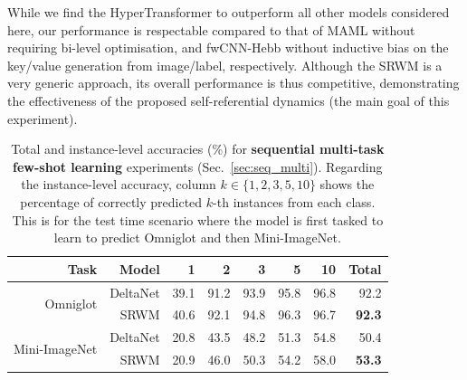 \documentclass[nohyperref]{article}
\theoremstyle{plain}
\theoremstyle{definition}
\theoremstyle{remark}
\begin{document}
While we find the HyperTransformer to outperform all other models considered here,
our performance is respectable compared to that of MAML without requiring bi-level optimisation, and fwCNN-Hebb without inductive bias on the key/value generation from image/label, respectively.
Although the SRWM is a very generic approach, its overall performance is thus competitive,
demonstrating the effectiveness of the proposed self-referential dynamics (the main goal of this experiment).


\begin{table}[h]
\caption{Total and instance-level accuracies (\%) for \textbf{sequential multi-task few-shot learning}
experiments (Sec.~\ref{sec:seq_multi}).
Regarding the instance-level accuracy, column $k \in \{1, 2, 3, 5, 10\}$ shows the percentage of correctly predicted $k$-th instances from each class.
This is for the test time scenario where the model is first tasked to learn to predict Omniglot and then Mini-ImageNet.
}
\label{tab:seq_adapt}
\begin{center}
\begin{tabular}{rr|rrrrr|r}
\toprule
Task & Model & 1 & 2 & 3 & 5 & 10 & Total \\ \midrule
\multirow{2}{*}{Omniglot}  & DeltaNet & 39.1 & 91.2 & 93.9 & 95.8 & 96.8 & 92.2 \\
         & SRWM & 40.6 & 92.1 & 94.8 & 96.3 & 96.7 & \textbf{92.3}  \\ \midrule

\multirow{2}{*}{Mini-ImageNet}  & DeltaNet & 20.8 & 43.5 & 48.2 & 51.3 & 54.8 & 50.4 \\
         & SRWM & 20.9 & 46.0 & 50.3 & 54.2 & 58.0 & \textbf{53.3} \\  
\bottomrule
\end{tabular}
\end{center}
\end{table}
\end{document}

